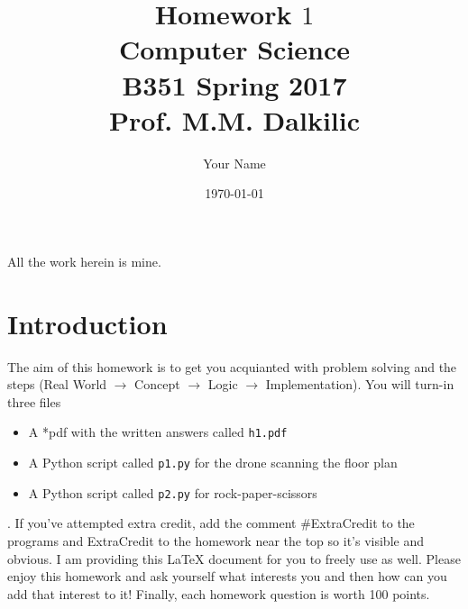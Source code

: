 \documentclass{article}
\begin{document}
\title{Homework $1$\\ Computer Science \\ B351 Spring 2017\\ Prof. M.M. Dalkilic}         %
\author{Your Name}        %
\date{\today}          %
\maketitle


\makeatother     %




\pagestyle{plain}
All the work herein is mine.
\section*{Introduction}
The aim of this homework is to get you acquianted with problem solving and the steps  (Real World $\rightarrow$ Concept $\rightarrow$ Logic  $\rightarrow$ Implementation).  You will turn-in three files\begin{itemize} \item A *pdf with the written answers called \texttt{h1.pdf} \item A Python script called \texttt{p1.py} for the drone scanning the floor plan \item  A Python script called  \texttt{p2.py} for rock-paper-scissors \end{itemize}.  If you've attempted extra credit, add the comment \#ExtraCredit to the programs and ExtraCredit to the homework near the top so it's visible and obvious.  I am providing this \LaTeX{} document for you to freely use as well. Please enjoy this homework and ask yourself what interests you and then how can you add that interest to it!  Finally, each homework question is worth 100 points.
\newpage
\end{document}
